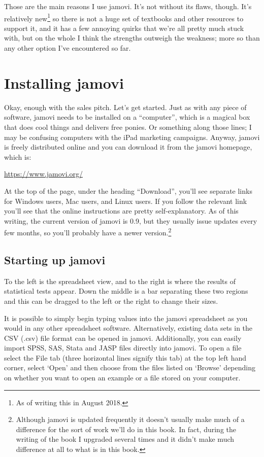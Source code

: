 \documentclass[
]{book}
\begin{document}
Those are the main reasons I use jamovi. It's not without its flaws, though. It's relatively new\footnote{As of writing this in August 2018.} so there is not a huge set of textbooks and other resources to support it, and it has a few annoying quirks that we're all pretty much stuck with, but on the whole I think the strengths outweigh the weakness; more so than any other option I've encountered so far.

\hypertarget{gettingjamovi}{%
\section{Installing jamovi}\label{gettingjamovi}}

Okay, enough with the sales pitch. Let's get started. Just as with any piece of software, jamovi needs to be installed on a ``computer'', which is a magical box that does cool things and delivers free ponies. Or something along those lines; I may be confusing computers with the iPad marketing campaigns. Anyway, jamovi is freely distributed online and you can download it from the jamovi homepage, which is:

\url{https://www.jamovi.org/}

At the top of the page, under the heading ``Download'', you'll see separate links for Windows users, Mac users, and Linux users. If you follow the relevant link you'll see that the online instructions are pretty self-explanatory. As of this writing, the current version of jamovi is 0.9, but they usually issue updates every few months, so you'll probably have a newer version.\footnote{Although jamovi is updated frequently it doesn't usually make much of a difference for the sort of work we'll do in this book. In fact, during the writing of the book I upgraded several times and it didn't make much difference at all to what is in this book.}

\hypertarget{starting-up-jamovi}{%
\subsection{Starting up jamovi}\label{starting-up-jamovi}}

To the left is the spreadsheet view, and to the right is where the results of statistical tests appear. Down the middle is a bar separating these two regions and this can be dragged to the left or the right to change their sizes.

It is possible to simply begin typing values into the jamovi spreadsheet as you would in any other spreadsheet software. Alternatively, existing data sets in the CSV (.csv) file format can be opened in jamovi. Additionally, you can easily import SPSS, SAS, Stata and JASP files directly into jamovi. To open a file select the File tab (three horizontal lines signify this tab) at the top left hand corner, select `Open' and then choose from the files listed on `Browse' depending on whether you want to open an example or a file stored on your computer.
\end{document}
